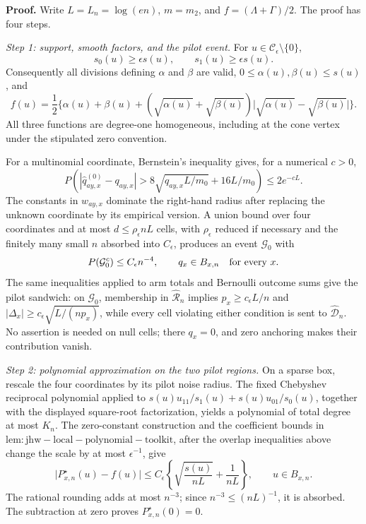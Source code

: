 \textbf{Proof.}
Write \(L=L_n=\log(en)\), \(m=m_2\), and \(f=(\Lambda+\Gamma)/2\).  The proof has four steps.

\emph{Step 1: support, smooth factors, and the pilot event.}
For \(u\in\mathcal C_\epsilon\setminus\{0\}\),
\[
 s_0(u)\ge\epsilon s(u),\qquad s_1(u)\ge\epsilon s(u).
\]
Consequently all divisions defining \(\alpha\) and \(\beta\) are valid, \(0\le\alpha(u),\beta(u)\le s(u)\), and
\[
 f(u)=\frac12\{\alpha(u)+\beta(u)
  +(\sqrt{\alpha(u)}+\sqrt{\beta(u)})
     \lvert\sqrt{\alpha(u)}-\sqrt{\beta(u)}\rvert\}.
\]
All three functions are degree-one homogeneous, including at the cone vertex under the stipulated zero convention.

For a multinomial coordinate, Bernstein's inequality gives, for a numerical \(c>0\),
\[
 P\!\left(
  \left\lvert\widehat q^{(0)}_{ay,x}-q_{ay,x}\right\rvert
  >8\sqrt{q_{ay,x}L/m_0}+16L/m_0
 \right)\le2e^{-cL}.
\]
The constants in \(w_{ay,x}\) dominate the right-hand radius after replacing the unknown coordinate by its empirical version.  A union bound over four coordinates and at most \(d\le\rho_\epsilon nL\) cells, with \(\rho_\epsilon\) reduced if necessary and the finitely many small \(n\) absorbed into \(C_\epsilon\), produces an event \(\mathcal G_0\) with
\[
 P(\mathcal G_0^c)\le C_\epsilon n^{-4},
 \qquad q_x\in B_{x,n}\quad\hbox{for every }x.
\]
The same inequalities applied to arm totals and Bernoulli outcome sums give the pilot sandwich: on \(\mathcal G_0\), membership in \(\widehat{\mathcal R}_n\) implies \(p_x\ge c_\epsilon L/n\) and \(\lvert\Delta_x\rvert\ge c_\epsilon\sqrt{L/(np_x)}\), while every cell violating either condition is sent to \(\widehat{\mathcal D}_n\).  No assertion is needed on null cells; there \(q_x=0\), and zero anchoring makes their contribution vanish.

\emph{Step 2: polynomial approximation on the two pilot regions.}
On a sparse box, rescale the four coordinates by its pilot noise radius.  The fixed Chebyshev reciprocal polynomial applied to \(s(u)u_{11}/s_1(u)+s(u)u_{01}/s_0(u)\), together with the displayed square-root factorization, yields a polynomial of total degree at most \(K_n\).  The zero-constant construction and the coefficient bounds in \(\mathrm{lem:jhw-local-polynomial-toolkit}\), after the overlap inequalities above change the scale by at most \(\epsilon^{-1}\), give
\[
 \lvert P^\star_{x,n}(u)-f(u)\rvert
 \le C_\epsilon\left\{
  \sqrt{\frac{s(u)}{nL}}+\frac1{nL}
 \right\},
 \qquad u\in B_{x,n}.
\]
The rational rounding adds at most \(n^{-3}\); since \(n^{-3}\le(nL)^{-1}\), it is absorbed.  The subtraction at zero proves \(P^\star_{x,n}(0)=0\).

